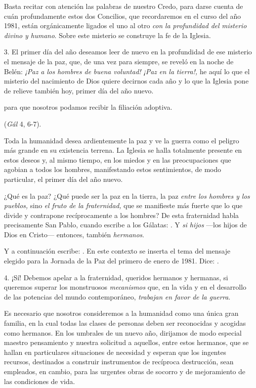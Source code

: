 Basta recitar con atención las palabras de nuestro Credo, para darse cuenta de cuán profundamente estos dos Concilios, que recordaremos en el curso del año 1981, están orgánicamente ligados el uno al otro \emph{con la profundidad del misterio divino y humano}. Sobre este misterio se construye la fe de la Iglesia.

3. El primer día del año deseamos leer de nuevo en la profundidad de ese misterio el mensaje de la paz, que, de una vez para siempre, se reveló en la noche de Belén: \emph{¡Paz a los hombres de buena voluntad! ¡Paz en la tierra!,} he aquí lo que el misterio del nacimiento de Dios quiere decirnos cada año y lo que la Iglesia pone de relieve también hoy, primer día del año nuevo.

 para que nosotros podamos recibir la filiación adoptiva.

 (\emph{Gál} 4, 6-7).

Toda la humanidad desea ardientemente la paz y ve la guerra como el peligro más grande en su existencia terrena. La Iglesia se halla totalmente presente en estos deseos y, al mismo tiempo, en los miedos y en las preocupaciones que agobian a todos los hombres, manifestando estos sentimientos, de modo particular, el primer día del año nuevo.

¿Qué es la paz? ¿Qué puede ser la paz en la tierra, la paz \emph{entre los hombres y los pueblos,} sino \emph{el fruto de la fraternidad,} que se manifieste más fuerte que lo que divide y contrapone recíprocamente a los hombres? De esta fraternidad habla precisamente San Pablo, cuando escribe a los Gálatas: . Y \emph{si hijos} ---los hijos de Dios en Cristo--- entonces, también \emph{hermanos}.

Y a continuación escribe: . En este contexto se inserta el tema del mensaje elegido para la Jornada de la Paz del primero de enero de 1981. Dice: \emph{}.

4. ¡Sí! Debemos apelar a la fraternidad, queridos hermanos y hermanas, si queremos superar los monstruosos \emph{mecanismos} que, en la vida y en el desarrollo de las potencias del mundo contemporáneo, \emph{trabajan en favor de la guerra}.

Es necesario que nosotros consideremos a la humanidad como una única gran familia, en la cual todas las clases de personas deben ser reconocidas y acogidas como hermanos. En los umbrales de un nuevo año, dirijamos de modo especial maestro pensamiento y nuestra solicitud a aquellos, entre estos hermanos, que se hallan en particulares situaciones de necesidad y esperan que los ingentes recursos, destinados a construir instrumentos de recíproca destrucción, sean empleados, en cambio, para las urgentes obras de socorro y de mejoramiento de las condiciones de vida.

